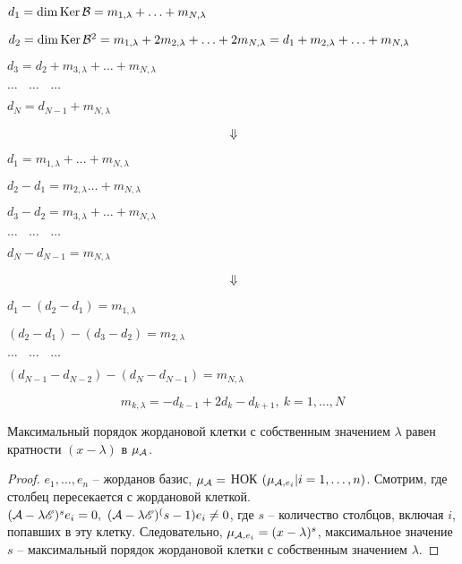 \documentclass[main]{subfiles}
\begin{document}
$d_1 = \dim\operatorname{Ker}{\mathcal{B}} = m_{1,\lambda} + \ldots + m_{N,\lambda}$

$d_2 = \dim\operatorname{Ker}{\mathcal{B}}^2 = m_{1,\lambda} + 2m_{2,\lambda} + \ldots + 2m_{N,\lambda} = d_1 + m_{2,\lambda}+ \ldots + m_{N,\lambda}$

$d_3 = d_2 + m_{3,\lambda} + \ldots + m_{N,\lambda}$

$\dots \ \ \ \ \dots \ \ \ \ \dots$

$d_N = d_{N-1} + m_{N,\lambda}$

\[
  \rotatebox[origin=c]{270}{$\Rightarrow$}
\]


$d_1 = m_{1,\lambda} + \ldots + m_{N,\lambda}$

$d_2 - d_1 = m_{2,\lambda} \ldots + m_{N,\lambda} $

$d_3 - d_2 = m_{3,\lambda} + \ldots + m_{N,\lambda}$

$\dots \ \ \ \ \dots \ \ \ \ \dots$

$d_N - d_{N-1} = m_{N,\lambda}$

\[
  \rotatebox[origin=c]{270}{$\Rightarrow$}
\]

$d_1 - (d_2 -d_1) = m_{1,\lambda}$

$(d_2 - d_1) -(d_3- d_2) = m_{2,\lambda}$

$\dots \ \ \ \ \dots \ \ \ \ \dots$

$(d_{N-1} - d_{N-2}) -(d_N -d_{N-1}) = m_{N,\lambda}$

\[
  m_{k,\lambda} = -d_{k-1}+2d_k-d_{k+1},\ k = 1,\ldots, N
\]

\begin{remark}
  Максимальный порядок жордановой клетки с собственным значением $\lambda$
  равен кратности $(x - \lambda)$ в $\mu_{\mathcal{A}}$.
\end{remark}

\begin{proof}
  $e_1, \ldots, e_n$ -- жорданов базис, $\mu_{\mathcal{A}}=$ НОК $(\mu_{\mathcal{A}, e_i} | i = 1, \ldots, n)$. Смотрим, где столбец пересекается с жордановой клеткой.
  $(\mathcal{A} - \lambda \mathscr{E})^s e_i = 0, \ (\mathcal{A} - \lambda \mathscr{E})^(s-1) e_i \neq 0$, где $s$ -- количество столбцов, включая $i$, попавших в эту клетку.
  Следовательно, $\mu_{\mathcal{A}, e_i} = (x - \lambda)^s$, максимальное значение $s$ -- максимальный порядок жордановой клетки с собственным значением $\lambda$.
\end{proof}
\end{document}
